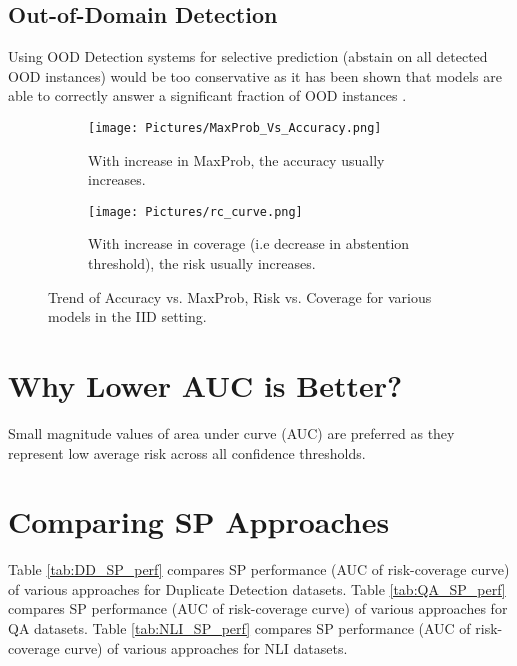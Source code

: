 \documentclass[11pt]{article}
\begin{document}
\subsection{Out-of-Domain Detection}
Using OOD Detection systems for selective prediction (abstain on all detected OOD instances) would be too conservative as it has been shown that models are able to correctly answer a significant fraction of OOD instances \cite{talmor-berant-2019-multiqa,hendrycks-etal-2020-pretrained, Mishra2020OurEM}.

\begin{figure*}[t]
\centering
    \begin{subfigure}{.4\textwidth}
         \texttt{[image: Pictures/MaxProb\_Vs\_Accuracy.png]}
         \caption{With increase in MaxProb, the accuracy usually increases.}
        \label{fig:maxProb_graph}
    \end{subfigure}
    \begin{subfigure}{.4\textwidth}
        \texttt{[image: Pictures/rc\_curve.png]}
        \caption{With increase in coverage (i.e decrease in abstention threshold), the risk usually increases.}
        \label{fig:rc_curves}
    \end{subfigure}
    \caption{Trend of Accuracy vs. MaxProb, Risk vs. Coverage for various models in the IID setting.}
    \label{fig:maxProb}    
\end{figure*}

\section{Why Lower AUC is Better?}
Small magnitude values of area under curve (AUC) are preferred as they represent low average risk across all confidence thresholds.




\section{Comparing SP Approaches}


Table \ref{tab:DD_SP_perf} compares SP performance (AUC of risk-coverage curve) of various approaches for Duplicate Detection datasets.
Table \ref{tab:QA_SP_perf} compares SP performance (AUC of risk-coverage curve) of various approaches for QA datasets.
Table \ref{tab:NLI_SP_perf} compares SP performance (AUC of risk-coverage curve) of various approaches for NLI datasets.



\end{document}
